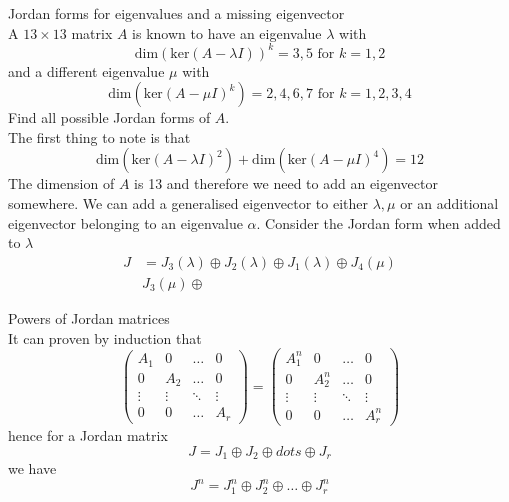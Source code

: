 \documentclass[journal, letterpaper]{IEEEtran}
\begin{document}
    \begin{myboxg}{Jordan forms for eigenvalues and a missing eigenvector} \\ 
        A $13 \times 13$ matrix $A$ is known to have an eigenvalue $\lambda$ with 
        $$ \text{dim}(\text{ker}(A - \lambda I))^k = 3, 5 \text{ for } k = 1, 2$$
        and a different eigenvalue $\mu$ with
        $$ \text{dim}(\text{ker}(A - \mu I)^k) = 2, 4, 6, 7 \text{ for } k = 1, 2, 3, 4$$
        Find all possible Jordan forms of $A$.
        \newline \\ 
        The first thing to note is that 
        $$ \text{dim}(\text{ker}(A - \lambda I)^2) + \text{dim}(\text{ker}(A - \mu I)^4) = 12$$
        The dimension of $A$ is 13 and therefore we need to add an eigenvector somewhere. We 
        can add a generalised eigenvector to either $\lambda, \mu$ or an additional eigenvector 
        belonging to an eigenvalue $\alpha$. Consider the Jordan form when added to $\lambda$
        \begin{align*}
            J &= J_3(\lambda) \oplus J_2(\lambda) \oplus J_1(\lambda) \oplus J_4(\mu) \\ 
            &J_3(\mu) \oplus 
        \end{align*}
    \end{myboxg}
    \begin{mybox}{Powers of Jordan matrices} \\
        It can proven by induction that 
        $$
        \begin{pmatrix}
            A_1 & 0 & \dots & 0 \\
            0 & A_2 & \dots & 0 \\
            \vdots & \vdots & \ddots & \vdots \\ 
            0 & 0 & \dots & A_r
        \end{pmatrix} = 
        \begin{pmatrix}
            A_1^n & 0 & \dots & 0 \\
            0 & A_2^n & \dots & 0 \\
            \vdots & \vdots & \ddots & \vdots \\ 
            0 & 0 & \dots & A_r^n
        \end{pmatrix}
        $$
        hence for a Jordan matrix
        $$ J = J_1 \oplus J_2 \oplus dots \oplus J_r $$
        we have
        $$ J^n = J_1^n \oplus J_2^n \oplus \dots \oplus J_r^n $$
    \end{mybox}
\end{document}

